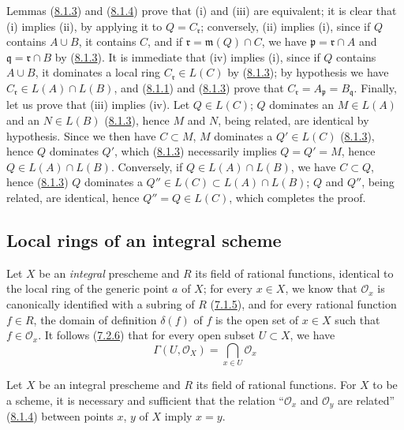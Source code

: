 Lemmas (\hyperref[I.8.1.3]{8.1.3}) and
(\hyperref[I.8.1.4]{8.1.4}) prove that (i) and (iii) are equivalent;
it is clear that (i) implies (ii), by applying it to $Q=C_\mathfrak r$;
conversely, (ii) implies (i), since if $Q$ contains $A\cup B$, it contains
$C$, and if $\mathfrak r=\mathfrak m(Q)\cap C$, we have
$\mathfrak p=\mathfrak r\cap A$ and $\mathfrak q=\mathfrak r\cap B$ by
(\hyperref[I.8.1.3]{8.1.3}). It is immediate that (iv) implies (i), since
if $Q$ contains $A\cup B$, it dominates a local ring
$C_\mathfrak r\in L(C)$ by (\hyperref[I.8.1.3]{8.1.3}); by hypothesis we
have $C_\mathfrak r\in L(A)\cap L(B)$, and
(\hyperref[I.8.1.1]{8.1.1}) and (\hyperref[I.8.1.3]{8.1.3}) prove that
$C_\mathfrak r=A_\mathfrak p=B_\mathfrak q$. Finally, let us prove that (iii)
implies (iv). Let $Q\in L(C)$; $Q$ dominates an $M\in L(A)$ and an
$N\in L(B)$ (\hyperref[I.8.1.3]{8.1.3}), hence $M$ and $N$, being
related, are identical by hypothesis. Since we then have $C\subset M$,
$M$ dominates a $Q'\in L(C)$ (\hyperref[I.8.1.3]{8.1.3}), hence $Q$
dominates $Q'$, which (\hyperref[I.8.1.3]{8.1.3}) necessarily implies
$Q=Q'=M$, hence $Q\in L(A)\cap L(B)$. Conversely, if
$Q\in L(A)\cap L(B)$, we have $C\subset Q$, hence
(\hyperref[I.8.1.3]{8.1.3}) $Q$ dominates a
$Q''\in L(C)\subset L(A)\cap L(B)$; $Q$ and $Q''$, being related, are
identical, hence $Q''=Q\in L(C)$, which completes the proof.

\subsection{Local rings of an integral scheme}
\label{subsection:I.8.2}

\begin{env}[8.2.1]
\label{I.8.2.1}
Let $X$ be an \emph{integral} prescheme and $R$ its field of rational
functions, identical to the local ring of the generic point $a$ of $X$; for
every $x\in X$, we know that $\mathscr{O}_x$ is canonically identified with a
subring of $R$ (\hyperref[I.7.1.5]{7.1.5}), and for every rational
function $f\in R$, the domain of definition $\delta(f)$ of $f$ is the open
set of $x\in X$ such that $f\in\mathscr{O}_x$. It follows
(\hyperref[I.7.2.6]{7.2.6}) that for every open subset $U\subset X$, we have
\begin{equation}
  \Gamma(U,\mathscr{O}_X)=\bigcap_{x\in U}\mathscr{O}_x
  \tag{8.2.1.1}\label{I.8.2.1.1}
\end{equation}
\end{env}

\begin{proposition}[8.2.2]
\label{I.8.2.2}
Let $X$ be an integral prescheme and $R$ its field of rational functions.
For $X$ to be a scheme, it is necessary and sufficient that the relation
``$\mathscr{O}_x$ and $\mathscr{O}_y$ are related''
\textup{(\hyperref[I.8.1.4]{8.1.4})} between points $x$, $y$ of $X$ imply $x=y$.
\end{proposition}

